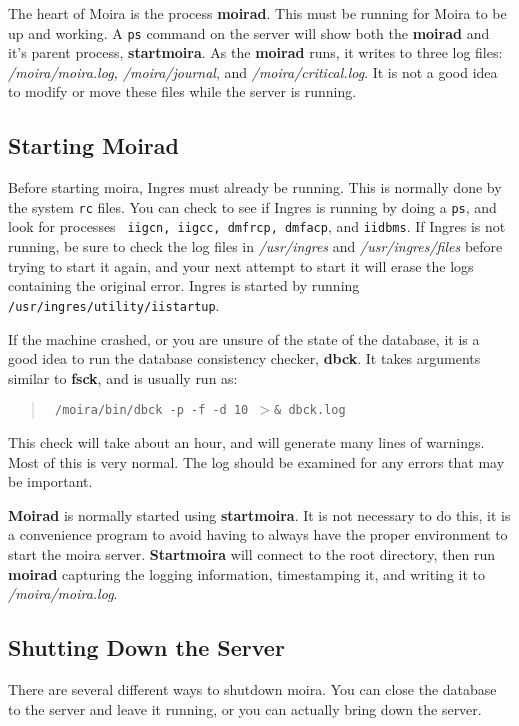 The heart of Moira is the process {\bf moirad}.  This must be running
for Moira to be up and working.  A {\tt ps} command on the server will
show both the {\bf moirad} and it's parent process, {\bf startmoira}.
As the {\bf moirad} runs, it writes to three log files: {\it
/moira/moira.log, /moira/journal}, and {\it /moira/critical.log}.  It
is not a good idea to modify or move these files while the server is
running.

\subsection{Starting {\bf Moirad}}

Before starting moira, Ingres must already be running.  This is
normally done by the system {\tt rc} files.  You can check to see if
Ingres is running by doing a {\tt ps}, and look for processes {\tt
iigcn, iigcc, dmfrcp, dmfacp}, and {\tt iidbms}.  If Ingres is not
running, be sure to check the log files in {\it /usr/ingres} and {\it
/usr/ingres/files} before trying to start it again, and your next
attempt to start it will erase the logs containing the original error.
Ingres is started by running {\tt /usr/ingres/utility/iistartup}.

If the machine crashed, or you are unsure of the state of the
database, it is a good idea to run the database consistency checker,
{\bf dbck}.  It takes arguments similar to {\bf fsck}, and is usually
run as:
\begin{quotation}\tt
/moira/bin/dbck -p -f -d 10 $>$\& dbck.log
\end{quotation}
This check will take about an hour, and will generate many lines of
warnings.  Most of this is very normal.  The log should be examined
for any errors that may be important.

{\bf Moirad} is normally started using {\bf startmoira}.
  It is not necessary to do this, it is a
convenience program to avoid having to always have the proper
environment to start the moira server.  {\bf Startmoira} will connect to
the root directory, then run {\bf moirad} capturing the logging
information, timestamping it, and writing it to {\em /moira/moira.log}.

\subsection{Shutting Down the Server}

There are several different ways to shutdown moira.  You can close the
database to the server and leave it running, or you can actually bring
down the server.

